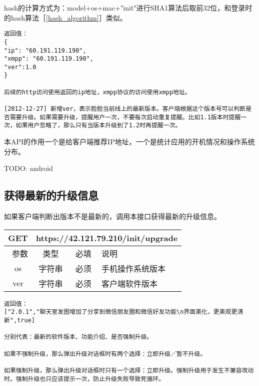 \documentclass[cs4size]{ctexartutf8}
\begin{document}
hash的计算方式为：model+os+mac+"init"进行SHA1算法后取前32位，和登录时的hash算法［\ref{hash_algorithm}］类似。

\begin{verbatim}
返回值：
{
"ip": "60.191.119.190",
"xmpp": "60.191.119.190",
"ver":1.0
}

后续的http访问使用返回的ip地址，xmpp协议的访问使用xmpp地址。

[2012-12-27] 新增ver，表示脸脸当前线上的最新版本。客户端根据这个版本号可以判断是否需要升级。如果需要升级，提醒用户一次，不要每次启动重复提醒。比如1.1版本时提醒一次，如果用户忽略了，那么只有当版本升级到了1.2时再提醒一次。

\end{verbatim}

本API的作用一个是给客户端推荐IP地址，一个是统计应用的开机情况和操作系统分布。

TODO: android

\subsection{获得最新的升级信息}

如果客户端判断出版本不是最新的，调用本接口获得最新的升级信息。
\begin{table}[H]
   \begin{center}
\begin{tabular}{|c|c|c|p{12cm}|}
\hline
GET & \multicolumn{3}{|c|}{https://42.121.79.210/init/upgrade} \\
\hline\hline
 \  参数  & 类型 & 必填 &  说明  \\
 \hline
 os  & 字符串 & 必须 &  手机操作系统版本\\
 \hline
 ver  & 字符串 & 必须 &  客户端软件版本\\
\hline
\end{tabular}
   \end{center}
\end{table}

\begin{verbatim}
返回值：
["2.0.1","聊天室发图增加了分享到微信朋友圈和微信好友功能\n界面美化，更美观更清新",true]

分别代表：最新的软件版本、功能介绍、是否强制升级。

如果不强制升级，那么弹出升级对话框时有两个选择：立即升级／暂不升级。

如果强制升级，那么弹出升级对话框时只有一个选择：立即升级。强制升级用于发生不兼容改动时。强制升级也只应该提示一次，防止升级失败导致死循环。
\end{verbatim}
\end{document}
